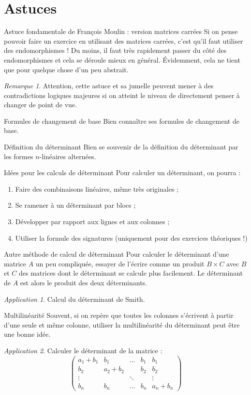 \documentclass[french]{book}
\theoremstyle{plain}
\theoremstyle{definition}
\theoremstyle{remark}
\newtheorem*{rmq}{Remarque}
\newtheorem*{app}{Application}
\begin{document}
\section{Astuces}
\begin{AS}{Astuce fondamentale de François Moulin : version matrices carrées} Si on pense pouvoir faire un exercice en utilisant des matrices carrées, c'est qu'il faut utiliser des endomorphismes ! Du moins, il faut très rapidement passer du côté des endomorphismes et cela se déroule mieux en général. Évidemment, cela ne tient que pour quelque chose d'un peu abstrait.
\end{AS}
\begin{rmq}
	Attention, cette astuce et sa jumelle peuvent mener à des contradictions logiques majeures si on atteint le niveau de directement penser à changer de point de vue.
\end{rmq}
\begin{AS}{Formules de changement de base} Bien connaître ses formules de changement de base.
\end{AS}
\begin{AS}{Définition du déterminant} Bien se souvenir de la définition du déterminant par les formes $n$-linéaires alternées.
\end{AS}
\begin{AS}{Idées pour les calculs de déterminant} Pour calculer un déterminant, on pourra : 
\begin{enumerate}
	\item Faire des combinaisons linéaires, même très originales ;
	\item Se ramener à un déterminant par blocs ;
	\item Développer par rapport aux lignes et aux colonnes ;
	\item Utiliser la formule des signatures (uniquement pour des exercices théoriques !)
\end{enumerate}
\end{AS}
\begin{AS}{Autre méthode de calcul de déterminant} Pour calculer le déterminant d'une matrice $A$ un peu compliquée, essayer de l'écrire comme un produit $B\times C$ avec $B$ et $C$ des matrices dont le déterminant se calcule plus facilement. Le déterminant de $A$ est alors le produit des deux déterminants.
\end{AS}
\begin{app}
	Calcul du déterminant de Smith.
\end{app}
\begin{AS}{Multilinéarité} Souvent, si on repère que toutes les colonnes s'écrivent à partir d'une seule et même colonne, utiliser la multilinéarité du déterminant peut être une bonne idée.
\end{AS} \begin{app}
	Calculer le déterminant de la matrice : $$\begin{pmatrix}
	a_1+b_1&b_1&\ldots&b_1&b_1 \\
	b_2&a_2+b_2&&b_2&b_2 \\
	\vdots&&\ddots&&\vdots \\
	b_n&b_n&\ldots&b_n&a_n+b_n
\end{pmatrix}$$
\end{app}
\end{document}
